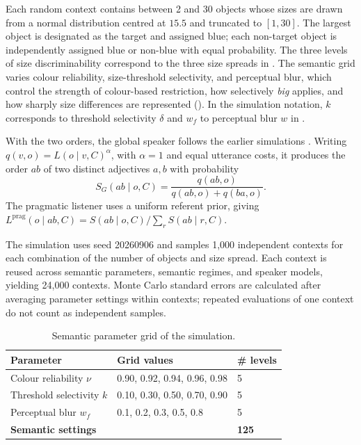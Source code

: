 \documentclass[10pt,a4paper,fleqn]{article}
\begin{document}
Each random context contains between 2 and 30 objects whose sizes are drawn from a normal distribution centred at $15.5$ and truncated to $[1,30]$.
The largest object is designated as the target and assigned blue; each non-target object is independently assigned blue or non-blue with equal probability.
The three levels of size discriminability correspond to the three size spreads in .
The semantic grid varies colour reliability, size-threshold selectivity, and perceptual blur, which control the strength of colour-based restriction, how selectively \emph{big} applies, and how sharply size differences are represented ().
In the simulation notation, $k$ corresponds to threshold selectivity $\delta$ and $w_f$ to perceptual blur $w$ in .

With the two orders, the global speaker follows the earlier simulations \citep{franke2019subjectivity}.
Writing $q(v,o)=L(o\mid v,C)^\alpha$, with $\alpha=1$ and equal utterance costs, it produces the order $ab$ of two distinct adjectives $a,b$ with probability
\begin{equation}
 S_G(ab\mid o,C)=\frac{q(ab,o)}{q(ab,o)+q(ba,o)}.
\end{equation}
The pragmatic listener uses a uniform referent prior, giving $L^{\mathrm{prag}}(o\mid ab,C)=S(ab\mid o,C)/\sum_r S(ab\mid r,C)$.

The simulation uses seed 20260906 and samples 1{,}000 independent contexts for each combination of the number of objects and size spread.
Each context is reused across semantic parameters, semantic regimes, and speaker models, yielding 24{,}000 contexts.
Monte Carlo standard errors are calculated after averaging parameter settings within contexts; repeated evaluations of one context do not count as independent samples.

\begin{table}[H]
  \caption{Semantic parameter grid of the simulation.}
  \label{tab:simulation}
  \centering
  \begin{tabularx}{0.92\textwidth}{lXl}
    \toprule
    \textbf{Parameter} & \textbf{Grid values} & \textbf{\# levels} \\
    \midrule
    Colour reliability $\nu$ & 0.90, 0.92, 0.94, 0.96, 0.98 & 5 \\
    Threshold selectivity $k$ & 0.10, 0.30, 0.50, 0.70, 0.90 & 5 \\
    Perceptual blur $w_f$ & 0.1, 0.2, 0.3, 0.5, 0.8 & 5 \\
    \midrule
    \textbf{Semantic settings} & & \textbf{125} \\
    \bottomrule
  \end{tabularx}
\end{table}
\end{document}

